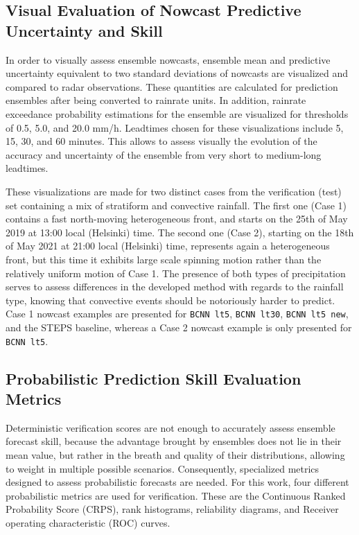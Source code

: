 \subsection{Visual Evaluation of Nowcast Predictive Uncertainty and Skill}
\label{section:viz_methods}

In order to visually assess ensemble nowcasts, ensemble mean and predictive uncertainty equivalent to two standard deviations of nowcasts are visualized and compared to radar observations. These quantities are calculated for prediction ensembles after being converted to rainrate units. In addition, rainrate exceedance probability estimations for the ensemble are visualized for thresholds of 0.5, 5.0, and 20.0 mm/h. Leadtimes chosen for these visualizations include 5, 15, 30, and 60 minutes. This allows to assess visually the evolution of the accuracy and uncertainty of the ensemble from very short to medium-long leadtimes. 

These visualizations are made for two distinct cases from the verification (test) set containing a mix of stratiform and convective rainfall. The first one (Case 1) contains a fast north-moving heterogeneous front, and starts on the 25th of May 2019 at 13:00 local (Helsinki) time. The second one (Case 2), starting on the 18th of May 2021 at 21:00 local (Helsinki) time, represents again a heterogeneous front, but this time it exhibits large scale spinning motion rather than the relatively uniform motion of Case 1. The presence of both types of precipitation serves to assess differences in the developed method with regards to the rainfall type, knowing that convective events should be notoriously harder to predict. Case 1 nowcast examples are presented for \texttt{BCNN lt5}, \texttt{BCNN lt30}, \texttt{BCNN lt5 new}, and the STEPS baseline, whereas a Case 2 nowcast example is only presented for \texttt{BCNN lt5}.

\subsection{Probabilistic Prediction Skill Evaluation Metrics}

\label{section:prob_metric}
Deterministic verification scores are not enough to accurately assess ensemble forecast skill, because the advantage brought by ensembles does not lie in their mean value, but rather in the breath and quality of their distributions, allowing to weight in multiple possible scenarios. Consequently, specialized metrics designed to assess probabilistic forecasts are needed. 
For this work, four different probabilistic metrics are used for verification. These are the Continuous Ranked Probability Score (CRPS), rank histograms, reliability diagrams, and Receiver operating characteristic (ROC) curves. 

